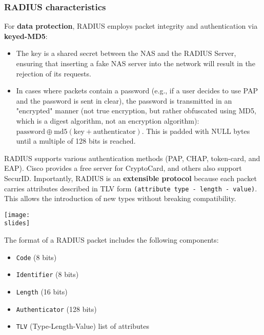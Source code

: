 \subsubsection{RADIUS characteristics}
For \textbf{data protection}, RADIUS employs packet integrity and authentication via \textbf{keyed-MD5}:

\begin{itemize}
    \item The key is a shared secret between the NAS and the RADIUS Server, ensuring that inserting a fake NAS server into the network will result in the rejection of its requests.
    \item In cases where packets contain a password (e.g., if a user decides to use PAP and the password is sent in clear), the password is transmitted in an "encrypted" manner (not true encryption, but rather obfuscated using MD5, which is a digest algorithm, not an encryption algorithm): \( \text{password} \oplus \text{md5}(\text{key} + \text{authenticator}) \). This is padded with NULL bytes until a multiple of 128 bits is reached.
\end{itemize}

RADIUS supports various authentication methods (PAP, CHAP, token-card, and EAP). Cisco provides a free server for CryptoCard, and others also support SecurID. Importantly, RADIUS is an \textbf{extensible protocol} because each packet carries attributes described in TLV form \texttt{(attribute type - length - value)}. This allows the introduction of new types without breaking compatibility.


\vspace*{5mm}
\noindent
\begin{minipage}{0.5\textwidth}
  \centering
  \texttt{[image: \\slides]}
\end{minipage}
\hspace{0.05\textwidth}
\begin{minipage}{0.4\textwidth}

    The format of a RADIUS packet includes the following components:
    \begin{itemize}
        \item \texttt{Code} (8 bits)
        \item \texttt{Identifier} (8 bits)
        \item \texttt{Length} (16 bits)
        \item \texttt{Authenticator} (128 bits)
        \item \texttt{TLV} (Type-Length-Value) list of attributes
    \end{itemize}  
\end{minipage}

